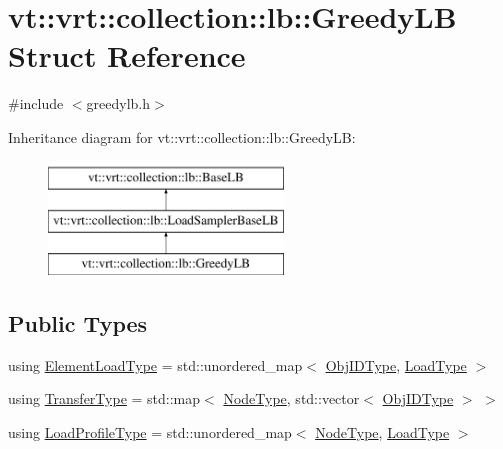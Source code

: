 \hypertarget{structvt_1_1vrt_1_1collection_1_1lb_1_1_greedy_l_b}{}\section{vt\+:\+:vrt\+:\+:collection\+:\+:lb\+:\+:Greedy\+LB Struct Reference}
\label{structvt_1_1vrt_1_1collection_1_1lb_1_1_greedy_l_b}


{\ttfamily \#include $<$greedylb.\+h$>$}

Inheritance diagram for vt\+:\+:vrt\+:\+:collection\+:\+:lb\+:\+:Greedy\+LB\+:\begin{figure}[H]
\begin{center}
\leavevmode
\includegraphics[height=3.000000cm]{structvt_1_1vrt_1_1collection_1_1lb_1_1_greedy_l_b}
\end{center}
\end{figure}
\subsection*{Public Types}
\begin{DoxyCompactItemize}
\item 
using \hyperlink{structvt_1_1vrt_1_1collection_1_1lb_1_1_greedy_l_b_aa499b608b1f72276dea47b7aa6ee38ff}{Element\+Load\+Type} = std\+::unordered\+\_\+map$<$ \hyperlink{structvt_1_1vrt_1_1collection_1_1lb_1_1_base_l_b_a790b22acf448880599724749cdc4e9b3}{Obj\+I\+D\+Type}, \hyperlink{namespacevt_a8fb51741340b87d7aaee0bef60e9896b}{Load\+Type} $>$
\item 
using \hyperlink{structvt_1_1vrt_1_1collection_1_1lb_1_1_greedy_l_b_af15e80ab3cfa9337647801dfa08fbf53}{Transfer\+Type} = std\+::map$<$ \hyperlink{namespacevt_a866da9d0efc19c0a1ce79e9e492f47e2}{Node\+Type}, std\+::vector$<$ \hyperlink{structvt_1_1vrt_1_1collection_1_1lb_1_1_base_l_b_a790b22acf448880599724749cdc4e9b3}{Obj\+I\+D\+Type} $>$ $>$
\item 
using \hyperlink{structvt_1_1vrt_1_1collection_1_1lb_1_1_greedy_l_b_a3db2c9b36ac99ed4aed38519be4aad60}{Load\+Profile\+Type} = std\+::unordered\+\_\+map$<$ \hyperlink{namespacevt_a866da9d0efc19c0a1ce79e9e492f47e2}{Node\+Type}, \hyperlink{namespacevt_a8fb51741340b87d7aaee0bef60e9896b}{Load\+Type} $>$
\end{DoxyCompactItemize}
